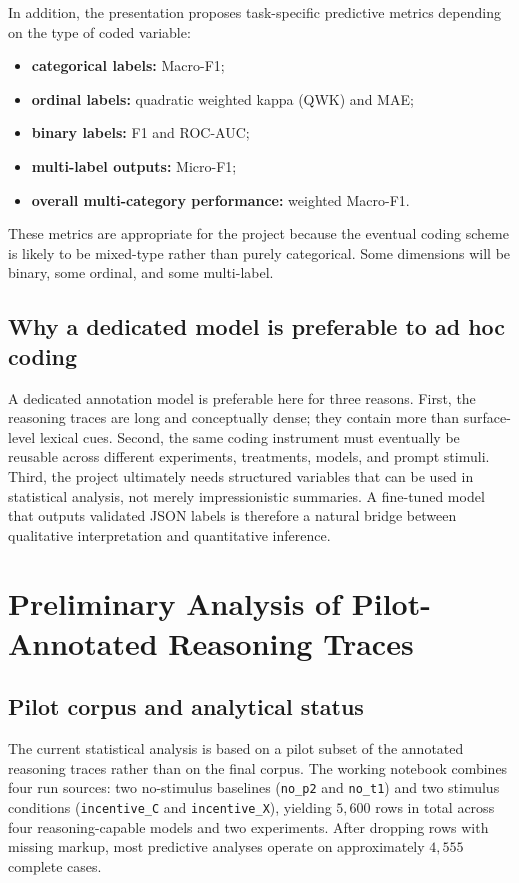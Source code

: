 \documentclass[14pt,a4paper]{extarticle}
\begin{document}
In addition, the presentation proposes task-specific predictive metrics depending on the type of coded variable:

\begin{itemize}
    \item \textbf{categorical labels:} Macro-F1;
    \item \textbf{ordinal labels:} quadratic weighted kappa (QWK) and MAE;
    \item \textbf{binary labels:} F1 and ROC-AUC;
    \item \textbf{multi-label outputs:} Micro-F1;
    \item \textbf{overall multi-category performance:} weighted Macro-F1.
\end{itemize}

These metrics are appropriate for the project because the eventual coding scheme is likely to be mixed-type rather than purely categorical. Some dimensions will be binary, some ordinal, and some multi-label.

\subsection{Why a dedicated model is preferable to ad hoc coding}

A dedicated annotation model is preferable here for three reasons. First, the reasoning traces are long and conceptually dense; they contain more than surface-level lexical cues. Second, the same coding instrument must eventually be reusable across different experiments, treatments, models, and prompt stimuli. Third, the project ultimately needs structured variables that can be used in statistical analysis, not merely impressionistic summaries. A fine-tuned model that outputs validated JSON labels is therefore a natural bridge between qualitative interpretation and quantitative inference.


\section{Preliminary Analysis of Pilot-Annotated Reasoning Traces}

\subsection{Pilot corpus and analytical status}

The current statistical analysis is based on a pilot subset of the annotated reasoning traces rather than on the final corpus. The working notebook combines four run sources: two no-stimulus baselines (\texttt{no\_p2} and \texttt{no\_t1}) and two stimulus conditions (\texttt{incentive\_C} and \texttt{incentive\_X}), yielding $5{,}600$ rows in total across four reasoning-capable models and two experiments. After dropping rows with missing markup, most predictive analyses operate on approximately $4{,}555$ complete cases.
\end{document}
